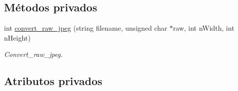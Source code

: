 \subsection*{Métodos privados}
\begin{DoxyCompactItemize}
\item 
int \hyperlink{classTemplateAFIS__webservice_a32fefd35ad3d702984aa442f4407515d}{convert\+\_\+raw\+\_\+jpeg} (string filename, unsigned char $\ast$raw, int n\+Width, int n\+Height)
\begin{DoxyCompactList}\small\item\em Convert\+\_\+raw\+\_\+jpeg. \end{DoxyCompactList}\end{DoxyCompactItemize}
\subsection*{Atributos privados}
